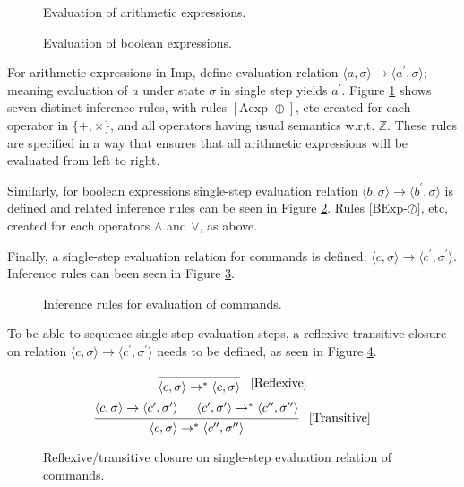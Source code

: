 \begin{figure}[H]

\caption{Evaluation of arithmetic expressions.}
\label{infer-arith}
\end{figure}
\begin{figure}[H]

\caption{Evaluation of boolean expressions.}
\label{infer-bool}
\end{figure}

For arithmetic expressions in Imp, define evaluation relation $\langle a, \sigma \rangle \rightarrow \langle a^\prime, \sigma  \rangle$; meaning evaluation of $a$ under state $\sigma$ in single step yields $a^\prime$. Figure \ref{infer-arith} shows seven distinct inference rules, with rules $[\text{Aexp-}\oplus]$, etc created for each operator in $\{+, \times \}$, and all operators having usual semantics w.r.t. $\mathbb{Z}$. These rules are specified in a way that ensures that all arithmetic expressions will be evaluated from left to right.


Similarly, for boolean expressions single-step evaluation relation $\langle b, \sigma \rangle \rightarrow \langle b^\prime, \sigma  \rangle$ is defined and related inference rules can be seen in Figure \ref{infer-bool}. Rules [$\text{BExp-}\oslash]$, etc, created for each operators $\land$ and $\lor$, as above.

Finally, a single-step evaluation relation for commands is defined: $\langle c, \sigma \rangle \rightarrow \langle c^\prime, \sigma^\prime \rangle$. Inference rules can been seen in Figure \ref{infer-comm}.

\begin{figure}[htb]

\caption{Inference rules for evaluation of commands.}
\label{infer-comm}
\end{figure}

To be able to sequence single-step evaluation steps, a reflexive transitive closure on relation $\langle c, \sigma \rangle \rightarrow \langle c^\prime, \sigma^\prime \rangle$ needs to be defined, as seen in Figure \ref{transitive-closure}.

\begin{figure}[ht]
\[
\begin{prooftree}
\infer0{
	\langle c, \sigma \rangle 
	\rightarrow^{*} \langle 
	c, \sigma \rangle
}
\end{prooftree} \; \; \; [\text{Reflexive}]
\]
\[
\begin{prooftree}
\hypo{
	\langle c, \sigma \rangle \rightarrow \langle c^\prime, \sigma^\prime \rangle
} 
\hypo{
	\langle c^\prime, \sigma^\prime \rangle \rightarrow^{*} \langle c^{\prime\prime}, \sigma^{\prime\prime} \rangle
}
\infer2{
	\langle c, \sigma \rangle \rightarrow^{*} \langle c^{\prime\prime}, \sigma^{\prime\prime} \rangle
}
\end{prooftree} \; \; \; [\text{Transitive}]
\]
\caption{Reflexive/transitive closure on single-step evaluation relation of commands.}
\label{transitive-closure}
\end{figure}


